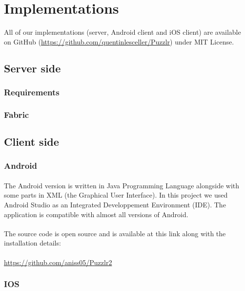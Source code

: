 \section{Implementations}
	\paragraph{}
	All of our implementations (server, Android client and iOS client) are available on GitHub (\url{https://github.com/quentinlesceller/Puzzlr}) under MIT License.
	\subsection{Server side}
 		\subsubsection{Requirements}
 		\subsubsection{Fabric} 
 	\subsection{Client side}
 		\subsubsection{Android}
  			\paragraph{}
			The Android version is written in Java Programming Language alongside with some parts in XML (the Graphical User Interface). In this project we used Android Studio as an Integrated Developpement Environment (IDE). The application is compatible with almost all versions of Android.
			\paragraph{}
			The source code is open source and is available at this link along with the installation details:
			\paragraph{}
			\color{blue}\underline{https://github.com/aniss05/Puzzlr2}\color{black} 
	  
	\subsubsection{IOS}